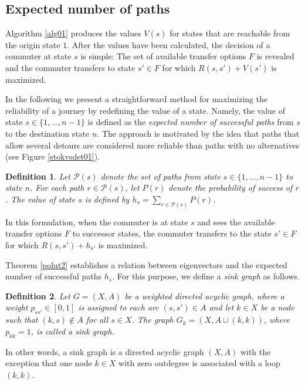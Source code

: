 \documentclass[dissertation,draft*]{aaltoseries}
\newtheorem*{definition}{Definition}
\begin{document}


\subsection{Expected number of paths}
\label{expected}
Algorithm \ref{alg01} produces the values $V(s)$ for states that are reachable from the origin state $1$.
After the values have been calculated, the decision of a commuter at state $s$ is simple:
The set of available transfer options $F$ is revealed and the commuter transfers to state 
$s' \in F$ for which $R(s,s')+V(s')$ is maximized.

In the following we present a straightforward method for maximizing the reliability of a journey
by redefining the value of a state. 
Namely, the value of state $s \in \{1,\ldots,n-1\}$ is defined as the \emph{expected number 
of successful paths} from $s$ to the destination state $n$. 
The approach is motivated by the idea that paths that allow several detours are considered
more reliable than paths with no alternatives (see Figure \ref{stokvsdet01}).
\begin{definition}
Let $\mathcal{P}(s)$ denote the set of paths from state $s \in \{1,\ldots,n-1\}$ to state $n$.
For each path $r \in \mathcal{P}(s)$, let $P(r)$ denote the probability of success of $r$.
The value of state $s$ is defined by $h_s = \sum_{r \in \mathcal{P}(s)} P(r)$.
\end{definition} 
In this formulation, when the commuter is at state $s$ and sees the available transfer options $F$ to successor states, 
the commuter transfers to the state $s' \in F$ for which $R(s,s') + h_{s'}$ is maximized.

Theorem \ref{polut2} establishes a relation between eigenvectors and the expected number of successful paths $h_s$.
For this purpose, we define a \emph{sink graph} as follows.
\begin{definition}
  Let $G=(X,A)$ be a weighted directed acyclic graph, where a weight $p_{ss'} \in [0,1]$ is assigned to each arc $(s,s') \in A$
and let $k \in X$ be a node such that $(k,s) \notin A$ for all $s \in X$.
The graph $G_k=(X, A \cup (k,k))$, where $p_{kk}=1$, is called a \emph{sink graph}. 
\end{definition}
In other words, a sink graph is a directed acyclic graph $(X,A)$ with the exception that one node $k \in X$ with zero outdegree is
associated with a loop $(k,k)$.
\end{document}
